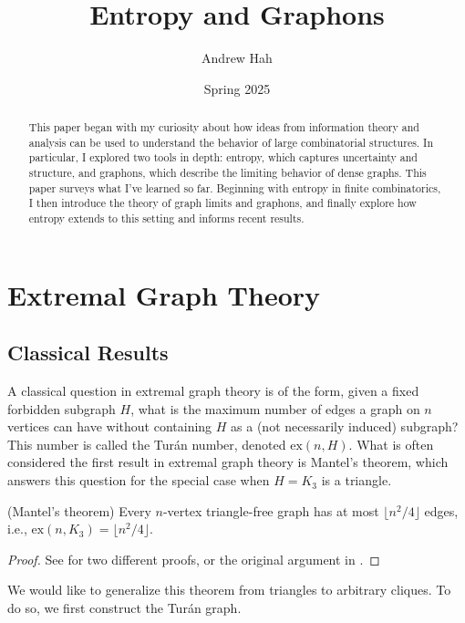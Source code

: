 \documentclass[11pt]{article}
\title{Entropy and Graphons}
\author{Andrew Hah}
\date{\vspace{-.75em}Spring 2025}
\begin{document}
\maketitle

\begin{abstract}
This paper began with my curiosity about how ideas from information theory and analysis can be used to understand the behavior of large combinatorial structures. In particular, I explored two tools in depth: entropy, which captures uncertainty and structure, and graphons, which describe the limiting behavior of dense graphs. This paper surveys what I’ve learned so far. Beginning with entropy in finite combinatorics, I then introduce the theory of graph limits and graphons, and finally explore how entropy extends to this setting and informs recent results.
\end{abstract}

\tableofcontents

\newpage

\section{Extremal Graph Theory}

\subsection{Classical Results}

A classical question in extremal graph theory is of the form, given a fixed forbidden subgraph \(H\), what is the maximum number of edges a graph on \(n\) vertices can have without containing \(H\) as a (not necessarily induced) subgraph? This number is called the Turán number, denoted $\mathrm{ex}(n, H)$. What is often considered the first result in extremal graph theory is Mantel's theorem, which answers this question for the special case when $H = K_3$ is a triangle.

\begin{theorem} (Mantel's theorem) Every $n$-vertex triangle-free graph has at most $\lfloor n^2 /4 \rfloor$ edges, i.e., $\mathrm{ex}(n, K_3) = \lfloor n^2 /4 \rfloor$.
\end{theorem}
\begin{proof} See \cite[Theorem~1.1.1]{gtac2023} for two different proofs, or the original argument in \cite{mantel1907}.
\end{proof}

We would like to generalize this theorem from triangles to arbitrary cliques. To do so, we first construct the Turán graph.
\end{document}
